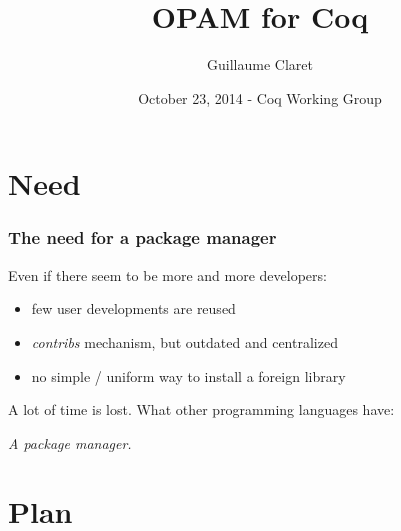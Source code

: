 \documentclass{beamer}
\begin{document}
  \title{OPAM for Coq}
  \author{Guillaume Claret}
  \date{October 23, 2014 - Coq Working Group}
  \maketitle

  \section*{Need}
  \begin{frame}
    \frametitle{The need for a package manager}
    Even if there seem to be more and more developers:
    \begin{itemize}
      \item few user developments are reused
      \item \emph{contribs} mechanism, but outdated and centralized
      \item no simple / uniform way to install a foreign library
    \end{itemize}
    A lot of time is lost. What other programming languages have:
    \begin{center}
      \emph{A package manager.}
    \end{center}
  \end{frame}

  \section*{Plan}
  \begin{frame}
    \tableofcontents
  \end{frame}
\end{document}
